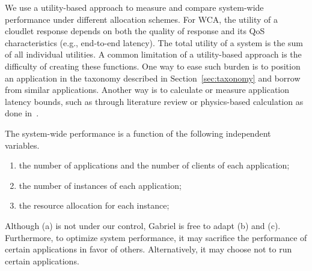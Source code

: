 We use a utility-based approach to measure and compare system-wide
performance under different allocation schemes. For WCA, the utility
of a cloudlet response depends on both the quality of response and its
QoS characteristics (e.g., end-to-end latency). The total utility of a
system is the sum of all individual utilities. A common limitation of
a utility-based approach is the difficulty of creating these
functions. One way to ease such burden is to position an application
in the taxonomy described in Section~\ref{sec:taxonomy} and borrow
from similar applications. Another way is to calculate or measure
application latency bounds, such as through literature review or
physics-based calculation as done in~\cite{chen2017empirical}.

The system-wide performance is a function of the following independent
variables. 
\begin{enumerate}[label=(\alph*)]
    \item the number of applications and the number of clients of
each application;
    \item the number of instances of each application;
    \item the resource allocation for each instance;
\end{enumerate}

Although (a) is not under our control, Gabriel is free to adapt (b) and (c).
Furthermore, to optimize system performance, it may sacrifice the performance of
certain applications in favor of others. Alternatively, it may choose not to run
certain applications.


